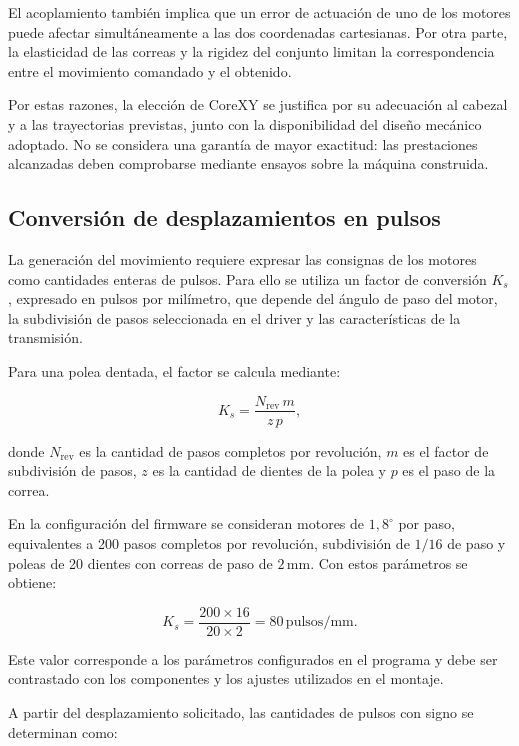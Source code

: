 \documentclass[blue,fullpaper]{ludusofficial}  %
\begin{document}
El acoplamiento también implica que
un error de actuación de uno de los
motores puede afectar simultáneamente
a las dos coordenadas cartesianas.
Por otra parte, la elasticidad de
las correas y la rigidez del conjunto
limitan la correspondencia entre
el movimiento comandado y el obtenido.

Por estas razones, la elección de CoreXY
se justifica por su adecuación al
cabezal y a las trayectorias previstas,
junto con la disponibilidad del diseño
mecánico adoptado. No se considera
una garantía de mayor exactitud:
las prestaciones alcanzadas deben
comprobarse mediante ensayos sobre
la máquina construida.

\subsection{Conversión de desplazamientos en pulsos}

La generación del movimiento requiere expresar
las consignas de los motores como cantidades
enteras de pulsos. Para ello se utiliza un factor
de conversión $K_s$, expresado en pulsos por milímetro,
que depende del ángulo de paso del motor,
la subdivisión de pasos seleccionada en el driver
y las características de la transmisión.

Para una polea dentada, el factor se calcula mediante:

\begin{equation}
    K_s =
    \frac{N_{\mathrm{rev}}\,m}{z\,p},
    \label{eq:pulsos-por-milimetro}
\end{equation}

donde $N_{\mathrm{rev}}$ es la cantidad de pasos
completos por revolución, $m$ es el factor de
subdivisión de pasos, $z$ es la cantidad de dientes
de la polea y $p$ es el paso de la correa.

En la configuración del firmware se consideran
motores de $1{,}8^\circ$ por paso, equivalentes
a 200 pasos completos por revolución, subdivisión
de $1/16$ de paso y poleas de 20 dientes con correas
de paso de $2\,\mathrm{mm}$. Con estos parámetros
se obtiene:

\begin{equation}
    K_s =
    \frac{200 \times 16}{20 \times 2}
    = 80\,\mathrm{pulsos/mm}.
\end{equation}

Este valor corresponde a los parámetros configurados
en el programa y debe ser contrastado con los
componentes y los ajustes utilizados en el montaje.

A partir del desplazamiento solicitado, las cantidades
de pulsos con signo se determinan como:
\end{document}

